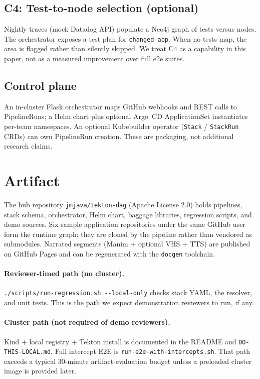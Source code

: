 \documentclass[10pt,conference]{IEEEtran}
\begin{document}
\subsection{C4: Test-to-node selection (optional)}
Nightly traces (mock Datadog API) populate a Neo4j graph of tests versus nodes. The orchestrator exposes a test plan for \texttt{changed-app}. When no tests map, the area is flagged rather than silently skipped. We treat C4 as a capability in this paper, not as a measured improvement over full e2e suites.

\subsection{Control plane}
An in-cluster Flask orchestrator maps GitHub webhooks and REST calls to PipelineRuns; a Helm chart plus optional Argo~CD ApplicationSet instantiates per-team namespaces. An optional Kubebuilder operator (\texttt{Stack} / \texttt{StackRun} CRDs) can own PipelineRun creation. These are packaging, not additional research claims.

\section{Artifact}
\label{sec:artifact}

The hub repository \texttt{jmjava/tekton-dag} (Apache License 2.0) holds pipelines, stack schema, orchestrator, Helm chart, baggage libraries, regression scripts, and demo sources. Six sample application repositories under the same GitHub user form the runtime graph; they are cloned by the pipeline rather than vendored as submodules. Narrated segments (Manim + optional VHS + TTS) are published on GitHub Pages and can be regenerated with the \texttt{docgen} toolchain.

\paragraph{Reviewer-timed path (no cluster).}
\texttt{./scripts/run-regression.sh -{}-local-only} checks stack YAML, the resolver, and unit tests. This is the path we expect demonstration reviewers to run, if any.

\paragraph{Cluster path (not required of demo reviewers).}
Kind + local registry + Tekton install is documented in the README and \texttt{DO-THIS-LOCAL.md}. Full intercept E2E is \texttt{run-e2e-with-intercepts.sh}. That path exceeds a typical 30-minute artifact-evaluation budget unless a preloaded cluster image is provided later.
\end{document}
